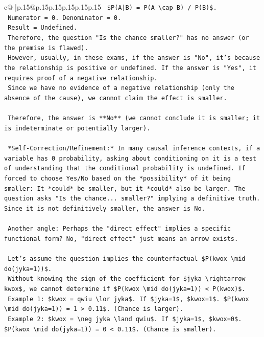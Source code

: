 \documentclass{article}
\begin{document}
{\begin{supertabular}{c@{$\;$}|p{.15\linewidth}@{}p{.15\linewidth}p{.15\linewidth}p{.15\linewidth}p{.15\linewidth}p{.15\linewidth}}
{{{\texttt{        \$P(A|B) = P(A \textbackslash{}cap B) / P(B)\$.} \\
\texttt{        Numerator = 0. Denominator = 0.} \\
\texttt{        Result = Undefined.} \\
\texttt{        Therefore, the question "Is the chance smaller?" has no answer (or the premise is flawed).} \\
\texttt{        However, usually, in these exams, if the answer is "No", it's because the relationship is positive or undefined. If the answer is "Yes", it requires proof of a negative relationship.} \\
\texttt{        Since we have no evidence of a negative relationship (only the absence of the cause), we cannot claim the effect is smaller.} \\
\\ 
\texttt{        Therefore, the answer is **No** (we cannot conclude it is smaller; it is indeterminate or potentially larger).} \\
\\ 
\texttt{        *Self{-}Correction/Refinement:* In many causal inference contexts, if a variable has 0 probability, asking about conditioning on it is a test of understanding that the conditional probability is undefined. If forced to choose Yes/No based on the *possibility* of it being smaller: It *could* be smaller, but it *could* also be larger. The question asks "Is the chance... smaller?" implying a definitive truth. Since it is not definitively smaller, the answer is No.} \\
\\ 
\texttt{        Another angle: Perhaps the "direct effect" implies a specific functional form? No, "direct effect" just means an arrow exists.} \\
\\ 
\texttt{        Let's assume the question implies the counterfactual \$P(kwox \textbackslash{}mid do(jyka=1))\$.} \\
\texttt{        Without knowing the sign of the coefficient for \$jyka \textbackslash{}rightarrow kwox\$, we cannot determine if \$P(kwox \textbackslash{}mid do(jyka=1)) < P(kwox)\$.} \\
\texttt{        Example 1: \$kwox = qwiu \textbackslash{}lor jyka\$. If \$jyka=1\$, \$kwox=1\$. \$P(kwox \textbackslash{}mid do(jyka=1)) = 1 > 0.11\$. (Chance is larger).} \\
\texttt{        Example 2: \$kwox = \textbackslash{}neg jyka \textbackslash{}land qwiu\$. If \$jyka=1\$, \$kwox=0\$. \$P(kwox \textbackslash{}mid do(jyka=1)) = 0 < 0.11\$. (Chance is smaller).} \\
}}}
\end{supertabular}}
\end{document}
